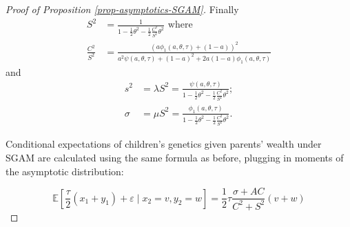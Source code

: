 \documentclass[
  12pt,
]{article}
\theoremstyle{definition}
\theoremstyle{definition}
\theoremstyle{definition}
\theoremstyle{definition}
\theoremstyle{remark}
\begin{document}
\begin{proof}[Proof of Proposition \ref{prop-asymptotics-SGAM}]
Finally
\begin{align*}
S^{2} & =\frac{1}{1-\frac{1}{2}\theta^{2}-\frac{1}{2}\frac{C^{2}}{S^{2}}\theta^{2}}\text{ where}\\
\frac{C^{2}}{S^{2}} & =\frac{\left(a\phi_{1}\left(a,\theta,\tau\right)+\left(1-a\right)\right)^{2}}{a^{2}\psi\left(a,\theta,\tau\right)+\left(1-a\right)^{2}+2a\left(1-a\right)\phi_{1}\left(a,\theta,\tau\right)}
\end{align*}
and
\begin{align*}
s^{2} & =\lambda S^{2}=\frac{\psi\left(a,\theta,\tau\right)}{1-\frac{1}{2}\theta^{2}-\frac{1}{2}\frac{C^{2}}{S^{2}}\theta^{2}};\\
\sigma & =\mu S^{2}=\frac{\phi_{1}\left(a,\theta,\tau\right)}{1-\frac{1}{2}\theta^{2}-\frac{1}{2}\frac{C^{2}}{S^{2}}\theta^{2}}.
\end{align*}

Conditional expectations of children's genetics given parents' wealth under SGAM
are calculated using the same formula as before, plugging in moments of the 
asymptotic distribution:

\[
\mathbb{E}\left[ \frac{\tau }{2}\left( x_{1}+y_{1}\right) +\varepsilon \mid
x_{2}=v,y_{2}=w\right]  = \frac{1}{2}\tau \frac{\sigma+AC%
}{C^{2}+S^{2}}\left( v+w\right)  
\]

\end{proof}
\end{document}
